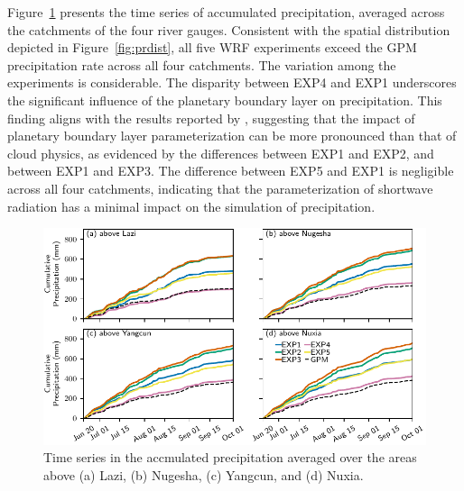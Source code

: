 \documentclass[draft]{agujournal2019}
\begin{document}
Figure~\ref{fig:prcumupts} presents the time series of accumulated precipitation, averaged across the catchments of the four river gauges. Consistent with the spatial distribution depicted in Figure~\ref{fig:prdist}, all five WRF experiments exceed the GPM precipitation rate across all four catchments. The variation among the experiments is considerable. The disparity between EXP4 and EXP1 underscores the significant influence of the planetary boundary layer on precipitation. This finding aligns with the results reported by , suggesting that the impact of planetary boundary layer parameterization can be more pronounced than that of cloud physics, as evidenced by the differences between EXP1 and EXP2, and between EXP1 and EXP3. The difference between EXP5 and EXP1 is negligible across all four catchments, indicating that the parameterization of shortwave radiation has a minimal impact on the simulation of precipitation.

\begin{figure}[h!]
      \centering
      \noindent\includegraphics[width=140mm]{prrn_prcumupts.pdf}
      \caption{Time series in the accmulated precipitation averaged over the areas above (a) Lazi, (b) Nugesha, (c) Yangcun, and (d) Nuxia. \label{fig:prcumupts}}
\end{figure}
\end{document}
